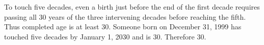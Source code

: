 To touch five decades, even a birth just before the end of the first decade requires passing all 30 years of the three intervening decades before reaching the fifth. Thus completed age is at least 30. Someone born on December 31, 1999 has touched five decades by January 1, 2030 and is 30. Therefore $\boxed{30}$.
